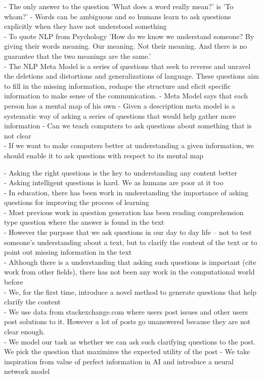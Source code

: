 \documentclass[11pt]{article}
\begin{document}
\iffalse
- The only answer to the question 'What does a word really mean?' is 'To whom?'
- Words can be ambiguous and so humans learn to ask questions explicitly when they have not understood something \\
- To quote NLP from Psychology \cite{o2011introducing} 'How do we know we understand someone? By giving their words meaning. Our meaning. Not  their meaning. And there is no guarantee that the two meanings are the same.' \\
- The NLP Meta Model \cite{bandler1975structure} is a series of questions that seek to reverse and unravel the deletions and distortions and generalizations of language. These questions aim to fill in the missing information, reshape the structure and elicit specific information to make sense of the communication.
- Meta Model says that each person has a mental map of his own
- Given a description meta model is a systematic way of asking a series of questions that would help gather more information 
- Can we teach computers to ask questions about something that is not clear \\
- If we want to make computers better at understanding a given information, we should enable it to ask questions with respect to its mental map

- Asking the right questions is the key to understanding any content better \\
- Asking intelligent questions is hard. We as humans are poor at it too \\
- In education, there has been work in understanding the importance of asking questions for improving the process of learning \\
- Most previous work in question generation has been reading comprehension type question where the answer is found in the text \\
- However the purpose that we ask questions in our day to day life -- not to test someone's understanding about a text, but to clarify the content of the text or to point out missing information in the text \\
- Although there is a understanding that asking such questions is important (cite work from other fields), there has not been any work in the computational world before \\
- We, for the first time, introduce a novel method to generate questions that help clarify the content \\
- We use data from stackexchange.com where users post issues and other users post solutions to it. However a lot of posts go unanswered because they are not clear enough. \\
- We model our task as whether we can ask such clarifying questions to the post.  We pick the question that maximizes the expected utility of the post
- We take inspiration from value of perfect information in AI and introduce a neural network model 
\end{document}

